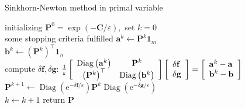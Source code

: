 \documentclass{article}
\begin{document}
\begin{algorithm}[H]
  \SetAlgoNoLine
  \caption{Sinkhorn-Newton method in primal variable} 
   initializing $\mathbf{P} ^ { 0 } = \exp ( - \mathbf{C} / \varepsilon ) ,$ set $k = 0$\\
  \Repeat
  { some stopping criteria fulfilled }{
 $\mathbf{a} ^ { k } \gets \mathbf{P} ^ { k } \mathbf{1}_ { m }$\\  
 $\mathbf{b} ^ { k } \gets \left( \mathbf{P} ^ { k } \right) ^ { \top } \mathbf { 1 } _ { n }$\\
  compute $\delta \mathbf{f}, \delta \mathbf{g}$: 
  \quad$\frac { 1 } { \varepsilon } \left[ \begin{array} { c c } { \operatorname { Diag } \left( \mathbf{a} ^ { k } \right) } & { \mathbf{P} ^ { k } } \\ { \left( \mathbf{P} ^ { k } \right) ^ { \top } } & { \operatorname { Diag } \left( \mathbf{b} ^ { k } \right) } \end{array} \right] \left[ \begin{array} { l } { \delta \mathbf{f} } \\ { \delta \mathbf{g} } \end{array} \right] = \left[ \begin{array} { l } { \mathbf{a} ^ { k } - \mathbf{a} } \\ { \mathbf{b} ^ { k } - \mathbf{b} } \end{array} \right]$\\
$\mathbf{P} ^ { k + 1 } \gets \operatorname { Diag } \left( \mathrm { e } ^ { - \delta \mathbf{f} / \varepsilon } \right) \mathbf{P} ^ { k } \operatorname { Diag } \left( \mathrm { e } ^ { - \delta \mathbf{g} / \varepsilon } \right)$\\
   $k\gets k+1$
  }
  return $\mathbf{P}$
\end{algorithm}
\end{document}
